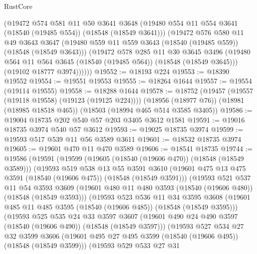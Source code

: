 \begin{lexlean}{RustCore}
\begin{coremodule}
        (@19472
          @574
          @581
          @11
          @50
          @3641
          @3648
          (@19480 @554 @11 @554 @3641 (@18540 (@19485 @554)) (@18548 (@18549 @3641)))
          (@19472
            @576
            @580
            @11
            @49
            @3643
            @3647
            (@19480 @559 @11 @559 @3643 (@18540 (@19485 @559)) (@18548 (@18549 @3643)))
            (@19472
              @578
              @285
              @11
              @30
              @3645
              @3496
              (@19480 @564 @11 @564 @3645 (@18540 (@19485 @564)) (@18548 (@18549 @3645)))
              (@19102 @18777 @3974))))))
@19552 := @18193 @224
@19553 := @18390 @19552
@19554 := @19551 @19553
@19555 := @18264 @1644
@19557 := @19554 (@19114 @19555)
@19558 := @18288 @1644
@19578 := @18752
    (@19457 (@19557 (@19118 @19558) (@19123 (@19125 @224))))
    (@18956 (@18977 @76))
    (@18981 (@18985 @18518 @465))
    (@18503 (@18994 @465 @514 @3585 @3405))
@19586 := @19004 @18735 @202 @540 @57 @203 @3405 @3612 @1581
@19591 := @19016 @18735 @3974 @540 @57 @3612
@19593 := @19025 @18735 @3974
@19599 := @19593 @517 @539 @11 @56 @3589 @3611
@19601 := @18532 @18735 @3974
@19605 := @19601 @470 @11 @470 @3589
@19606 := @18541 @18735
@19744 := @19586
    (@19591
      (@19599
        (@19605 (@18540 (@19606 @470)) (@18548 (@18549 @3589)))
        (@19593
          @519
          @538
          @13
          @55
          @3591
          @3610
          (@19601 @475 @13 @475 @3591 (@18540 (@19606 @475)) (@18548 (@18549 @3591)))
          (@19593
            @521
            @537
            @11
            @54
            @3593
            @3609
            (@19601 @480 @11 @480 @3593 (@18540 (@19606 @480)) (@18548 (@18549 @3593)))
            (@19593
              @523
              @536
              @11
              @34
              @3595
              @3608
              (@19601 @485 @11 @485 @3595 (@18540 (@19606 @485)) (@18548 (@18549 @3595)))
              (@19593
                @525
                @535
                @24
                @33
                @3597
                @3607
                (@19601 @490 @24 @490 @3597 (@18540 (@19606 @490)) (@18548 (@18549 @3597)))
                (@19593
                  @527
                  @534
                  @27
                  @32
                  @3599
                  @3606
                  (@19601 @495 @27 @495 @3599 (@18540 (@19606 @495)) (@18548 (@18549 @3599)))
                  (@19593
                    @529
                    @533
                    @27
                    @31

\end{coremodule}
\end{lexlean}
